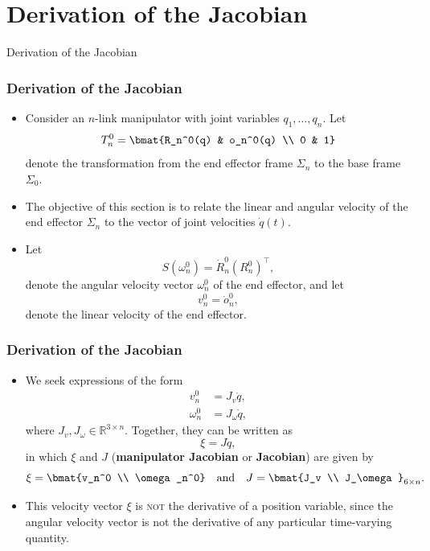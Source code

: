 \section{Derivation of the Jacobian}

\begin{frame}
    Derivation of the Jacobian


\end{frame}

\begingroup
\small


\begin{frame}
    \frametitle{Derivation of the Jacobian}

    \begin{itemize}
        \item Consider an $n$-link manipulator with joint variables $q_1, \ldots, q_n$. Let
        \[ T_n^0 = \bmat{R_n^0(q) & o_n^0(q) \\ 0 & 1} \] denote the
            transformation from the end effector frame $\Sigma_n$ to the base
            frame $\Sigma_0$.
        \item The objective of this section is to relate the linear and angular
        velocity of the end effector $\Sigma_n$ to the vector of joint
        velocities $\dot{q}(t)$. 
        \item Let \[ S\left( \omega_n^0 \right) = \dot{R}_n^0 \left( R_n^0 \right)^\top, \]
        denote the angular velocity vector $\omega_n^0$ of the end effector, and let
        \[ v_n^0 = \dot{o}_n^0, \] denote the linear velocity of the end effector.
    \end{itemize}
\end{frame}


\begin{frame}
    \frametitle{Derivation of the Jacobian}

    \begin{itemize}
        \item We seek expressions of the form
        \begin{align}
            v_n^0 &= J_v\dot{q} \label{eq:def_jac_v}, \\
            \omega_n^0 &= J_\omega\dot{q} \label{eq:def_jac_omega},
        \end{align}
        where $J_v, J_\omega \in \mathbb{R}^{3 \times n}$. Together, they can be
        written as 
        \[ \xi = J\dot{q}, \] in which $\xi$ and $J$ (\textbf{manipulator
        Jacobian} or \textbf{Jacobian}) are given by 
        \[ \xi = \bmat{v_n^0 \\ \omega_n^0} \quad \text{and} \quad J = \bmat{J_v \\ J_\omega}_{6 \times n}. \]
        \item This velocity vector $\xi$ is \textsc{not} the derivative of a
        position variable, since the angular velocity vector is not the
        derivative of any particular time-varying quantity.
    \end{itemize}
\end{frame}


